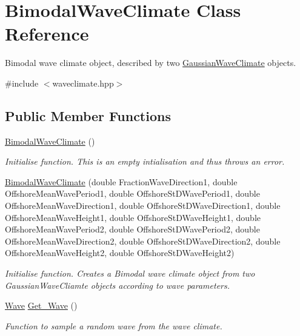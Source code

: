 \hypertarget{classBimodalWaveClimate}{\section{Bimodal\-Wave\-Climate Class Reference}
\label{classBimodalWaveClimate}
}


Bimodal wave climate object, described by two \hyperlink{classGaussianWaveClimate}{Gaussian\-Wave\-Climate} objects.  




{\ttfamily \#include $<$waveclimate.\-hpp$>$}

\subsection*{Public Member Functions}
\begin{DoxyCompactItemize}
\item 
\hyperlink{classBimodalWaveClimate_a777945ca022955d69afcc4f4f41a6499}{Bimodal\-Wave\-Climate} ()
\begin{DoxyCompactList}\small\item\em Initialise function. This is an empty intialisation and thus throws an error. \end{DoxyCompactList}\item 
\hyperlink{classBimodalWaveClimate_a78ead7837c7926ac7ef9d132d8a5c18a}{Bimodal\-Wave\-Climate} (double Fraction\-Wave\-Direction1, double Offshore\-Mean\-Wave\-Period1, double Offshore\-St\-D\-Wave\-Period1, double Offshore\-Mean\-Wave\-Direction1, double Offshore\-St\-D\-Wave\-Direction1, double Offshore\-Mean\-Wave\-Height1, double Offshore\-St\-D\-Wave\-Height1, double Offshore\-Mean\-Wave\-Period2, double Offshore\-St\-D\-Wave\-Period2, double Offshore\-Mean\-Wave\-Direction2, double Offshore\-St\-D\-Wave\-Direction2, double Offshore\-Mean\-Wave\-Height2, double Offshore\-St\-D\-Wave\-Height2)
\begin{DoxyCompactList}\small\item\em Initialise function. Creates a Bimodal wave climate object from two Gaussian\-Wave\-Cliamte objects according to wave parameters. \end{DoxyCompactList}\item 
\hyperlink{classWave}{Wave} \hyperlink{classBimodalWaveClimate_a6aa9562b9beaaafbae60e85e68337e32}{Get\-\_\-\-Wave} ()
\begin{DoxyCompactList}\small\item\em Function to sample a random wave from the wave climate. \end{DoxyCompactList}\end{DoxyCompactItemize}


